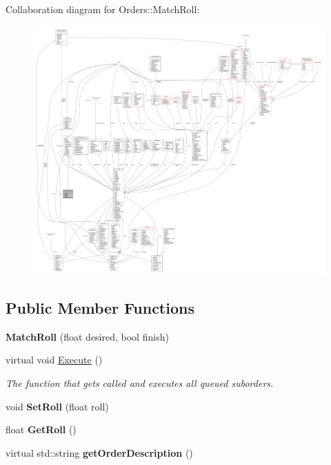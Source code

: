 Collaboration diagram for Orders\+:\+:Match\+Roll\+:
\nopagebreak
\begin{figure}[H]
\begin{center}
\leavevmode
\includegraphics[width=350pt]{da/dfb/classOrders_1_1MatchRoll__coll__graph}
\end{center}
\end{figure}
\subsection*{Public Member Functions}
\begin{DoxyCompactItemize}
\item 
{\bfseries Match\+Roll} (float desired, bool finish)\hypertarget{classOrders_1_1MatchRoll_ac90a9db501afdc67f68b992db6c75cc5}{}\label{classOrders_1_1MatchRoll_ac90a9db501afdc67f68b992db6c75cc5}

\item 
virtual void \hyperlink{classOrders_1_1MatchRoll_aa597b9da97a5e2d01b242a29a4b744f2}{Execute} ()\hypertarget{classOrders_1_1MatchRoll_aa597b9da97a5e2d01b242a29a4b744f2}{}\label{classOrders_1_1MatchRoll_aa597b9da97a5e2d01b242a29a4b744f2}

\begin{DoxyCompactList}\small\item\em The function that gets called and executes all queued suborders. \end{DoxyCompactList}\item 
void {\bfseries Set\+Roll} (float roll)\hypertarget{classOrders_1_1MatchRoll_a8e4cbdc23126d9249f489d870fb4a88a}{}\label{classOrders_1_1MatchRoll_a8e4cbdc23126d9249f489d870fb4a88a}

\item 
float {\bfseries Get\+Roll} ()\hypertarget{classOrders_1_1MatchRoll_a9c4a88612b69fec657f7e48e61afef86}{}\label{classOrders_1_1MatchRoll_a9c4a88612b69fec657f7e48e61afef86}

\item 
virtual std\+::string {\bfseries get\+Order\+Description} ()\hypertarget{classOrders_1_1MatchRoll_a3cf4b981ad604166bda879e49f033252}{}\label{classOrders_1_1MatchRoll_a3cf4b981ad604166bda879e49f033252}

\end{DoxyCompactItemize}
